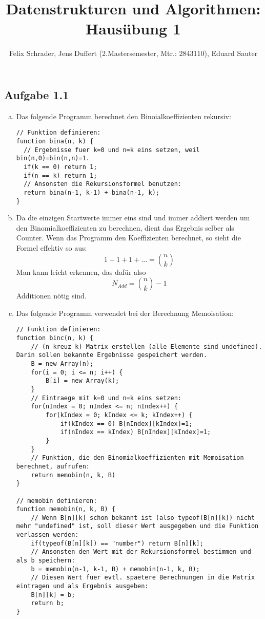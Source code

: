 \documentclass[11pt]{article}
\author{Felix Schrader, Jens Duffert (2.Mastersemester, Mtr.: 2843110), Eduard Sauter}
\title{Datenstrukturen und Algorithmen: Haus\"ubung 1}
\begin{document}
\maketitle

\subsection*{Aufgabe 1.1}
\begin{enumerate}[a)]

\item Das folgende Programm berechnet den Binoialkoeffizienten rekursiv:

\begin{lstlisting}
// Funktion definieren:
function bina(n, k) {
  // Ergebnisse fuer k=0 und n=k eins setzen, weil bin(n,0)=bin(n,n)=1.
  if(k == 0) return 1;
  if(n == k) return 1;
  // Ansonsten die Rekursionsformel benutzen:
  return bina(n-1, k-1) + bina(n-1, k);
}
\end{lstlisting}

\item Da die einzigen Startwerte immer eins sind und immer addiert werden um den Binomialkoeffizienten zu berechnen, dient das Ergebnis selber als Counter. Wenn das Programm den Koeffizienten berechnet, so sieht die Formel effektiv so aus:\[ 1+1+1+\dots =\binom{n}{k} \]
Man kann leicht erkennen, das daf\"ur also
\begin{equation}
N_{Add}=\binom{n}{k}-1
\end{equation}
Additionen n\"otig sind.

\item Das folgende Programm verwendet bei der Berechnung Memoisation:

\begin{lstlisting}
// Funktion definieren:
function binc(n, k) {
    // (n kreuz k)-Matrix erstellen (alle Elemente sind undefined). Darin sollen bekannte Ergebnisse gespeichert werden.
    B = new Array(n);
    for(i = 0; i <= n; i++) {
        B[i] = new Array(k);
    }
    // Eintraege mit k=0 und n=k eins setzen:
    for(nIndex = 0; nIndex <= n; nIndex++) {
        for(kIndex = 0; kIndex <= k; kIndex++) {
            if(kIndex == 0) B[nIndex][kIndex]=1;
            if(nIndex == kIndex) B[nIndex][kIndex]=1;
        }
    }
    // Funktion, die den Binomialkoeffizienten mit Memoisation berechnet, aufrufen:
    return memobin(n, k, B)
}

// memobin definieren:
function memobin(n, k, B) {
    // Wenn B[n][k] schon bekannt ist (also typeof(B[n][k]) nicht mehr "undefined" ist, soll dieser Wert ausgegeben und die Funktion verlassen werden:
    if(typeof(B[n][k]) == "number") return B[n][k];
    // Ansonsten den Wert mit der Rekursionsformel bestimmen und als b speichern:
    b = memobin(n-1, k-1, B) + memobin(n-1, k, B);
    // Diesen Wert fuer evtl. spaetere Berechnungen in die Matrix eintragen und als Ergebnis ausgeben:
    B[n][k] = b;
    return b;
}
\end{lstlisting}

\end{enumerate}
\end{document}
